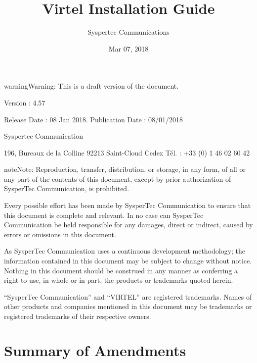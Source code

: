 \documentclass[letterpaper,10pt,english]{sphinxmanual}
\title{Virtel Installation Guide}
\date{Mar 07, 2018}
\author{Syspertec Communications}
\begin{document}
\maketitle
\sphinxtableofcontents
{}\label{\detokenize{Installation_Guide::doc}}




\begin{sphinxadmonition}{warning}{Warning:}
This is a draft version of the document.
\end{sphinxadmonition}

Version : 4.57

Release Date : 08 Jan 2018. Publication Date : 08/01/2018

Syspertec Communication

196, Bureaux de la Colline 92213 Saint-Cloud Cedex Tél. : +33 (0) 1 46 02 60 42


\begin{sphinxadmonition}{note}{Note:}
Reproduction, transfer, distribution, or storage, in any form, of all or any part of
the contents of this document, except by prior authorization of SysperTec
Communication, is prohibited.

Every possible effort has been made by SysperTec Communication to ensure that this document
is complete and relevant. In no case can SysperTec Communication be held responsible for
any damages, direct or indirect, caused by errors or omissions in this document.

As SysperTec Communication uses a continuous development methodology; the information
contained in this document may be subject to change without notice. Nothing in this
document should be construed in any manner as conferring a right to use, in whole or in
part, the products or trademarks quoted herein.

“SysperTec Communication” and “VIRTEL” are registered trademarks. Names of other products
and companies mentioned in this document may be trademarks or registered trademarks of
their respective owners.
\end{sphinxadmonition}

\newpage


\chapter{Summary of Amendments}
\label{\detokenize{Installation_Guide:vvrrig-summary-of-ammendments}}\label{\detokenize{Installation_Guide:summary-of-amendments}}\label{\detokenize{Installation_Guide:virtelvrrig}}\label{\detokenize{Installation_Guide:installation-guide-v4-57}}
\end{document}
